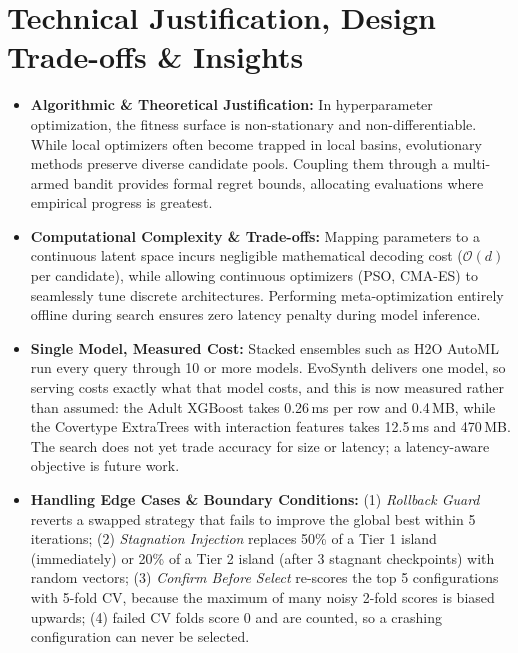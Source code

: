 \documentclass[11pt, a4paper]{article}
\begin{document}
\section{Technical Justification, Design Trade-offs \& Insights}
\begin{itemize}[noitemsep, topsep=2pt]
    \item \textbf{Algorithmic \& Theoretical Justification:} In hyperparameter optimization, the fitness surface is non-stationary and non-differentiable. While local optimizers often become trapped in local basins, evolutionary methods preserve diverse candidate pools. Coupling them through a multi-armed bandit provides formal regret bounds, allocating evaluations where empirical progress is greatest.
    \item \textbf{Computational Complexity \& Trade-offs:} Mapping parameters to a continuous latent space incurs negligible mathematical decoding cost ($\mathcal{O}(d)$ per candidate), while allowing continuous optimizers (PSO, CMA-ES) to seamlessly tune discrete architectures. Performing meta-optimization entirely offline during search ensures zero latency penalty during model inference.
    \item \textbf{Single Model, Measured Cost:} Stacked ensembles such as H2O AutoML run every query through 10 or more models. EvoSynth delivers one model, so serving costs exactly what that model costs, and this is now measured rather than assumed: the Adult XGBoost takes 0.26\,ms per row and 0.4\,MB, while the Covertype ExtraTrees with interaction features takes 12.5\,ms and 470\,MB. The search does not yet trade accuracy for size or latency; a latency-aware objective is future work.
    \item \textbf{Handling Edge Cases \& Boundary Conditions:} (1) \textit{Rollback Guard} reverts a swapped strategy that fails to improve the global best within 5 iterations; (2) \textit{Stagnation Injection} replaces 50\% of a Tier 1 island (immediately) or 20\% of a Tier 2 island (after 3 stagnant checkpoints) with random vectors; (3) \textit{Confirm Before Select} re-scores the top 5 configurations with 5-fold CV, because the maximum of many noisy 2-fold scores is biased upwards; (4) failed CV folds score 0 and are counted, so a crashing configuration can never be selected.
\end{itemize}

\end{document}
